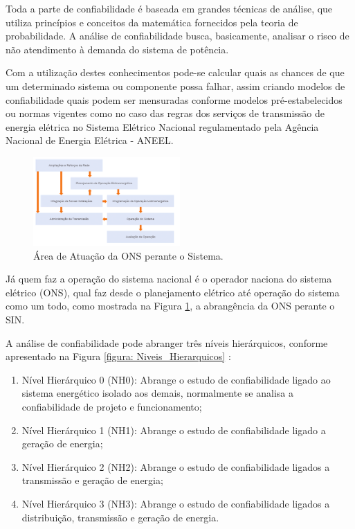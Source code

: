 \documentclass[lettersize,journal]{IEEEtran}
\begin{document}
Toda a parte de confiabilidade é baseada em grandes técnicas de análise, que utiliza princípios e conceitos da matemática fornecidos pela teoria de probabilidade\cite{Armando2022}. A análise de confiabilidade busca, basicamente, analisar o risco de não atendimento à demanda do sistema de potência.

Com a utilização destes conhecimentos pode-se calcular quais as chances de que um determinado sistema ou componente possa falhar, assim criando modelos de confiabilidade quais podem ser mensuradas conforme modelos pré-estabelecidos ou normas vigentes como no caso das regras dos serviços de transmissão de energia elétrica no Sistema Elétrico Nacional regulamentado pela Agência Nacional de Energia Elétrica - ANEEL.

\begin{figure}[h]
\includegraphics[width=0.5\textwidth]{Figuras/ONS_ABRANGENCIA.png}
\centering
\caption{Área de Atuação da ONS perante o Sistema.}
\label{figura: ONS_AREA}
\end{figure}

\newpage

Já quem faz a operação do sistema nacional é o operador naciona do sistema elétrico (ONS), qual faz desde o planejamento elétrico até operação do sistema como um todo, como mostrada na Figura \ref{figura: ONS_AREA}, a abrangência da ONS perante o SIN.


A análise de confiabilidade pode abranger três níveis hierárquicos, conforme apresentado na Figura \ref{figura: Niveis_Hierarquicos} \cite{Cassula2003}:

\begin{enumerate}
	\item Nível Hierárquico 0 (NH0): Abrange o estudo de confiabilidade ligado ao sistema energético isolado aos demais, normalmente se analisa a confiabilidade de projeto e funcionamento;
	\item Nível Hierárquico 1 (NH1): Abrange o estudo de confiabilidade ligado a geração de energia;
	\item Nível Hierárquico 2 (NH2): Abrange o estudo de confiabilidade ligados a transmissão e geração de energia;
	\item Nível Hierárquico 3 (NH3): Abrange o estudo de confiabilidade ligados a distribuição, transmissão e geração de energia.
\end{enumerate}
\end{document}
